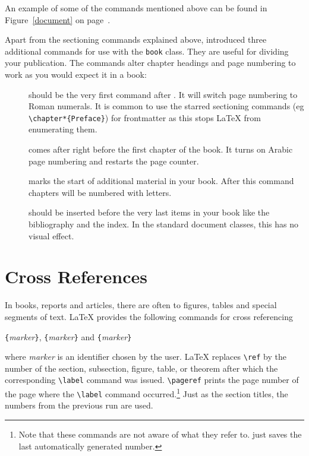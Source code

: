 An example of some of the commands mentioned above can be found in
Figure~\ref{document} on page~\pageref{document}.

Apart from the sectioning commands explained above, \LaTeXe{}
introduced three additional commands for use with the \verb|book| class. 
They are useful for dividing your publication. The commands alter
chapter headings and page numbering to work as you would expect it in
a book:
\begin{description}
\item[] should be the very first command after
  \verb||. It will switch page numbering to Roman
    numerals. It is common to use the starred sectioning commands (eg
    \verb|\chapter*{Preface}|) for
    frontmatter as this stops \LaTeX{} from
    enumerating them.
\item[] comes after right before the first chapter of
  the book. It turns on Arabic page numbering and restarts the page
  counter.
\item[] marks the start of additional material in your
  book. After this command chapters will be numbered with letters.
\item[] should be inserted before the very last items
  in your book like the bibliography and the index. In the standard
  document classes, this has no visual effect.
\end{description}


\section{Cross References}

In books, reports and articles, there are often 
 to figures, tables and special segments of text.
\LaTeX{} provides the following commands for cross referencing
\begin{lscommand}
\verb|{|\emph{marker}\verb|}|, \verb|{|\emph{marker}\verb|}| 
and \verb|{|\emph{marker}\verb|}|
\end{lscommand}
\noindent where \emph{marker} is an identifier chosen by the user. \LaTeX{}
replaces \verb|\ref| by the number of the section, subsection, figure,
table, or theorem after which the corresponding \verb|\label| command
was issued. \verb|\pageref| prints the page number of the
page where the \verb|\label| command occurred.\footnote{Note that these commands
  are not aware of what they refer to.  just saves the last
  automatically generated number.} Just as the section titles, the
numbers from the previous run are used.

